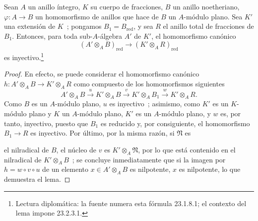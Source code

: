 \begin{lemma}[23.2.3]
\label{0.23.2.3-es}
Sean $A$ un anillo íntegro, $K$ su cuerpo de fracciones, $B$ un anillo
noetheriano, $\varphi:A\to B$ un homomorfismo de anillos que hace de $B$ un
$A$-módulo plano. Sea $K'$ una extensión de $K$~; pongamos
$B_1=B_{\mathrm{red}}$, y sea $R$ el anillo total de fracciones de $B_1$.
Entonces, para toda sub-$A$-álgebra $A'$ de $K'$, el homomorfismo canónico
\begin{equation}
\label{0.23.2.3.1-es}
  (A'\otimes_AB)_{\mathrm{red}}
  \longrightarrow(K'\otimes_AR)_{\mathrm{red}}
  \tag{23.2.3.1}
\end{equation}
es inyectivo.\footnote{Lectura diplomática: la fuente numera esta fórmula 23.1.8.1; el contexto del lema impone 23.2.3.1.}
\end{lemma}

\begin{proof}
En efecto, se puede considerar el homomorfismo canónico
$h:A'\otimes_AB\to K'\otimes_AR$ como compuesto de los homomorfismos siguientes
\[
  A'\otimes_AB\xrightarrow{u}K'\otimes_AB
  \xrightarrow{v}K'\otimes_AB_1\xrightarrow{w}K'\otimes_AR.
\]
Como $B$ es un $A$-módulo plano, $u$ es inyectivo~; asimismo, como $K'$ es un
$K$-módulo plano y $K$ un $A$-módulo plano, $K'$ es un $A$-módulo plano, y
$w$ es, por tanto, inyectivo, puesto que $B_1$ es reducido y, por consiguiente, el homomorfismo
$B_1\to R$ es inyectivo. Por último, por la misma razón, si $\mathfrak N$ es


el nilradical de $B$, el núcleo de $v$ es $K'\otimes_A\mathfrak N$, por lo que está
contenido en el nilradical de $K'\otimes_AB$~; se concluye inmediatamente que si
la imagen por $h=w\circ v\circ u$ de un elemento $x\in A'\otimes_AB$ es
nilpotente, $x$ es nilpotente, lo que demuestra el lema.
\end{proof}

